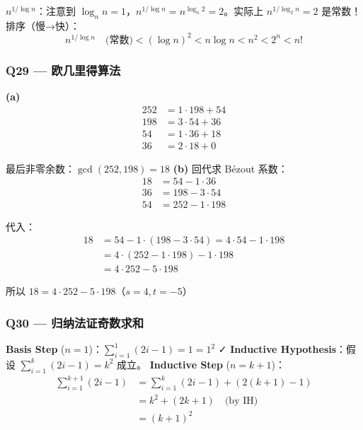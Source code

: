 \documentclass[10pt,a4paper,openany]{ctexbook}
\theoremstyle{definition}
\theoremstyle{remark}
\begin{document}
$n^{1/\log n}$：注意到 $\log_n n = 1$，$n^{1/\log n} = n^{\log_n 2} = 2$。实际上 $n^{1/\log_2 n} = 2$ 是常数！
排序（慢→快）：
\[
n^{1/\log n} \quad\text{(常数)} < (\log n)^2 < n\log n < n^2 < 2^n < n!
\]

\vspace{-2pt}

\subsubsection{Q29 — 欧几里得算法}

\textbf{(a)}
\[
\begin{aligned}
252 &= 1 \cdot 198 + 54 \\
198 &= 3 \cdot 54 + 36 \\
54 &= 1 \cdot 36 + 18 \\
36 &= 2 \cdot 18 + 0
\end{aligned}
\]

最后非零余数：$\gcd(252, 198) = 18$
\textbf{(b)} 回代求 Bézout 系数：
\[
\begin{aligned}
18 &= 54 - 1 \cdot 36 \\
36 &= 198 - 3 \cdot 54 \\
54 &= 252 - 1 \cdot 198
\end{aligned}
\]

代入：
\[
\begin{aligned}
18 &= 54 - 1 \cdot (198 - 3 \cdot 54) = 4 \cdot 54 - 1 \cdot 198 \\
&= 4 \cdot (252 - 1 \cdot 198) - 1 \cdot 198 \\
&= 4 \cdot 252 - 5 \cdot 198
\end{aligned}
\]

所以 $18 = 4 \cdot 252 - 5 \cdot 198$（$s = 4, t = -5$）
\vspace{-2pt}

\subsubsection{Q30 — 归纳法证奇数求和}

\textbf{Basis Step} ($n=1$)：$\sum_{i=1}^{1} (2i-1) = 1 = 1^2$ ✓
\textbf{Inductive Hypothesis}：假设 $\sum_{i=1}^{k} (2i-1) = k^2$ 成立。
\textbf{Inductive Step} ($n=k+1$)：
\[
\begin{aligned}
\sum_{i=1}^{k+1} (2i-1) &= \sum_{i=1}^{k} (2i-1) + (2(k+1) - 1) \\
&= k^2 + (2k + 1) \quad\text{(by IH)}\\
&= (k+1)^2
\end{aligned}
\]
\end{document}
